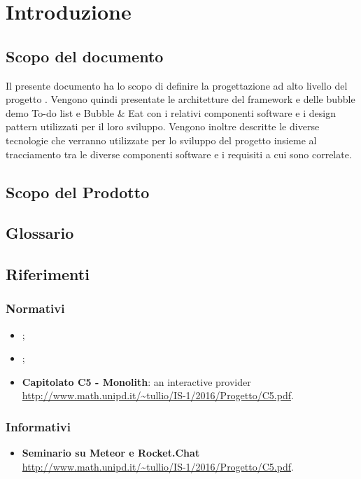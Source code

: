 \section{Introduzione}

\subsection{Scopo del documento}
Il presente documento ha lo scopo di definire la progettazione ad alto livello del progetto \ProjectName{}. Vengono quindi presentate le architetture del framework e delle bubble demo To-do list e Bubble \& Eat con i relativi componenti software e i design pattern utilizzati per il loro sviluppo. Vengono inoltre descritte le diverse tecnologie che verranno utilizzate per lo sviluppo del progetto insieme al tracciamento tra le diverse componenti software e i requisiti a cui sono correlate.

\subsection{Scopo del Prodotto}
\ScopoDelProdotto

\subsection{Glossario}
\GlossarioIntroduzione

\subsection{Riferimenti}
\subsubsection{Normativi}
\begin{itemize}
	\item \textbf{\NormeDiProgetto};
	\item \textbf{\AnalisiDeiRequisiti};
	\item \textbf{Capitolato C5 - Monolith}: an interactive 
	provider\\ \url{http://www.math.unipd.it/~tullio/IS-1/2016/Progetto/C5.pdf}.
\end{itemize}
\subsubsection{Informativi}
\begin{itemize}
	\item \textbf{Seminario su Meteor e Rocket.Chat}\\ \url{http://www.math.unipd.it/~tullio/IS-1/2016/Progetto/C5.pdf}.
\end{itemize}